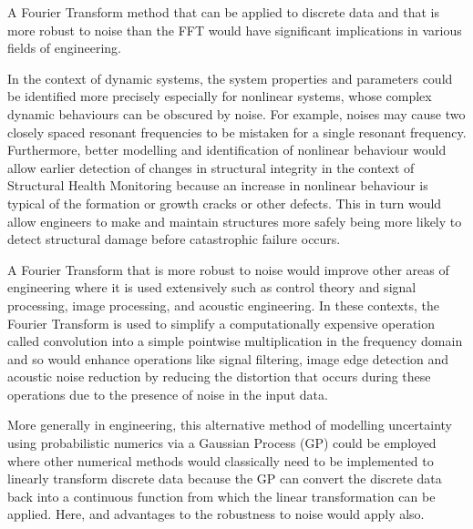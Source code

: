 \documentclass[12pt]{article}
\begin{document}
    A Fourier Transform method that can be applied to discrete data and that is more robust to noise than the FFT would have significant implications in various fields of engineering.

    In the context of dynamic systems, the system properties and parameters could be identified more precisely especially for nonlinear systems, whose complex dynamic behaviours can be obscured by noise.
    For example, noises may cause two closely spaced resonant frequencies to be mistaken for a single resonant frequency.
    Furthermore, better modelling and identification of nonlinear behaviour would allow earlier detection of changes in structural integrity in the context of Structural Health Monitoring because an increase in nonlinear behaviour is typical of the formation or growth cracks or other defects.
    This in turn would allow engineers to make and maintain structures more safely being more likely to detect structural damage before catastrophic failure occurs.

    A Fourier Transform that is more robust to noise would improve other areas of engineering where it is used extensively such as control theory and signal processing, image processing, and acoustic engineering.
    In these contexts, the Fourier Transform is used to simplify a computationally expensive operation called convolution into a simple pointwise multiplication in the frequency domain and so would enhance operations like signal filtering, image edge detection and acoustic noise reduction by reducing the distortion that occurs during these operations due to the presence of noise in the input data.


    More generally in engineering, this alternative method of modelling uncertainty using probabilistic numerics via a Gaussian Process (GP) could be employed where other numerical methods would classically need to be implemented to linearly transform discrete data because the GP can convert the discrete data back into a continuous function from which the linear transformation can be applied.
    Here, and advantages to the robustness to noise would apply also.
\end{document}
